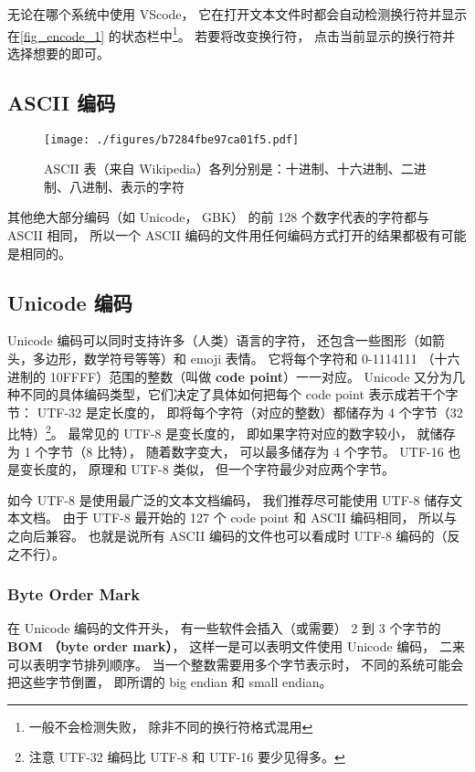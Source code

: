 无论在哪个系统中使用 VScode， 它在打开文本文件时都会自动检测换行符并显示在\autoref{fig_encode_1} 的状态栏中\footnote{一般不会检测失败， 除非不同的换行符格式混用}。 若要将改变换行符， 点击当前显示的换行符并选择想要的即可。

\subsection{ASCII 编码}\label{sub_encode_2}
\begin{figure}[ht]
\centering
\texttt{[image: ./figures/b7284fbe97ca01f5.pdf]}
\caption{ASCII 表（来自 Wikipedia）各列分别是：十进制、十六进制、二进制、八进制、表示的字符} \label{fig_encode_2}
\end{figure}


其他绝大部分编码（如 Unicode， GBK） 的前 128 个数字代表的字符都与 ASCII 相同， 所以一个 ASCII 编码的文件用任何编码方式打开的结果都极有可能是相同的。

\subsection{Unicode 编码}
Unicode 编码可以同时支持许多（人类）语言的字符， 还包含一些图形（如箭头，多边形，数学符号等等）和 emoji 表情。 它将每个字符和 0-1114111 （十六进制的 10FFFF）范围的整数（叫做 \textbf{code point}）一一对应。 Unicode 又分为几种不同的具体编码类型，它们决定了具体如何把每个 code point 表示成若干个字节： UTF-32 是定长度的， 即将每个字符（对应的整数）都储存为 4 个字节（32 比特）\footnote{注意 UTF-32 编码比 UTF-8 和 UTF-16 要少见得多。}。 最常见的 UTF-8 是变长度的， 即如果字符对应的数字较小， 就储存为 1 个字节（8 比特）， 随着数字变大， 可以最多储存为 4 个字节。 UTF-16 也是变长度的， 原理和 UTF-8 类似， 但一个字符最少对应两个字节。

如今 UTF-8 是使用最广泛的文本文档编码， 我们推荐尽可能使用 UTF-8 储存文本文档。 由于 UTF-8 最开始的 127 个 code point 和 ASCII 编码相同， 所以与之向后兼容。 也就是说所有 ASCII 编码的文件也可以看成时 UTF-8 编码的（反之不行）。

\subsubsection{Byte Order Mark}
在 Unicode 编码的文件开头， 有一些软件会插入（或需要） 2 到 3 个字节的 \textbf{BOM （byte order mark）}， 这样一是可以表明文件使用 Unicode 编码， 二来可以表明字节排列顺序。 当一个整数需要用多个字节表示时， 不同的系统可能会把这些字节倒置， 即所谓的 big endian 和 small endian。

